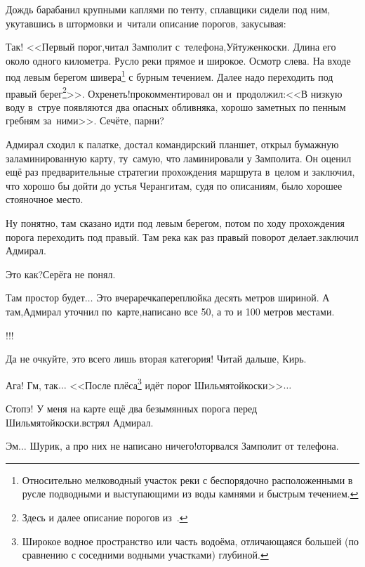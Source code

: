 Дождь барабанил крупными каплями по тенту, сплавщики сидели под ним, укутавшись в штормовки и~читали описание порогов, закусывая:

\renewcommand*{\thefootnote}{\arabic{footnote}}
\setcounter{footnote}{0}
\diagdash Так! <<Первый порог,\mdash читал Замполит с~телефона,\mdash Уйтуженкоски. Длина его около одного километра. Русло реки прямое и широкое. Осмотр слева. На входе под левым берегом шивера\footnote{Относительно мелководный участок реки с беспорядочно расположенными в русле подводными и выступающими из воды камнями и быстрым течением.} с бурным течением. Далее надо переходить под правый берег\footnote{Здесь и далее описание порогов из~\cite{Шилов}.}>>. Охренеть!\mdash прокомментировал он и~продолжил:\mdash <<В низкую воду в~струе появляются два опасных обливняка, хорошо заметных по пенным гребням за~ними>>. Сечёте, парни?

Адмирал сходил к палатке, достал командирский планшет, открыл бумажную заламинированную карту, ту~самую, что ламинировали у Замполита. Он оценил ещё раз предварительные стратегии прохождения маршрута в~целом и заключил, что хорошо бы дойти до устья Черанги\mdash там, судя по описаниям, было хорошее стояночное место.

\diagdash Ну понятно, там сказано идти под левым берегом, потом по ходу прохождения порога переходить под правый. Там река как раз правый поворот делает.\mdash заключил Адмирал.

\diagdash Это как?\mdash Серёга не понял.

\diagdash Там простор будет$\ldots$ Это вчера\mdash речка\sdash переплюйка десять метров шириной. А там,\mdash Адмирал уточнил по~карте,\mdash написано все 50, а то и 100 метров местами.

\diagdash !!!

\diagdash Да не очкуйте, это всего лишь вторая категория! Читай дальше, Кирь.

\renewcommand*{\thefootnote}{\arabic{footnote}}
\setcounter{footnote}{0}
\diagdash Ага! Гм, так$\ldots$ <<После плёса\footnote{Широкое водное пространство или часть водоёма, отличающаяся большей (по сравнению с соседними водными участками) глубиной.} идёт порог Шильмятойкоски>>$\ldots$

\diagdash Стопэ! У меня на карте ещё два безымянных порога перед Шильмятойкоски.\mdash встрял Адмирал.

\diagdash Эм$\ldots$ Шурик, а про них не написано ничего!\mdash оторвался Замполит от телефона.

